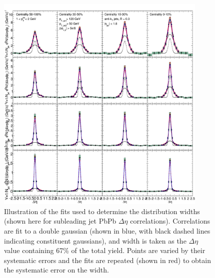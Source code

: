 \begin{figure}[hbtp]
\begin{center}

\includegraphics[width=0.9\textwidth]{figures/Appendices/Width_Check_Fits_Eta_PbPb_SubLeading.png}

\caption[Width determination for PbPb subleading jets]{Illustration of the fits used to determine the distribution widths (shown here for subleading jet PbPb $\Delta\eta$ correlations).  Correlations are fit to a double gaussian (shown in blue, with black dashed lines indicating constituent gaussians), and width is taken as the $\Delta\eta$ value containing 67\% of the total yield.  Points are varied by their systematic errors and the fits are repeated (shown in red) to obtain the systematic error on the width.}
\label{fig:Width_check_fit_PbPb_sublead}
\end{center}
\end{figure}



